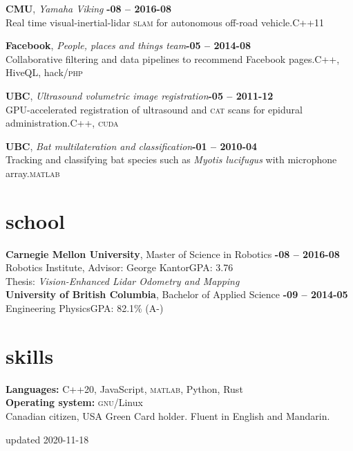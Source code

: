 \documentclass[margin,10pt]{res}
\begin{document}
\begin{resume}
    \textbf{CMU}, \textit{Yamaha Viking} \hfill \textsc{\bfseries{}-08 -- 2016-08}\\
    Real time visual-inertial-lidar \textsc{slam} for autonomous off-road vehicle.\hfill C++11

    \textbf{Facebook}, \textit{People, places and things team}\hfill \textsc{\bfseries{}-05 -- 2014-08}\\
    Collaborative filtering and data pipelines to recommend Facebook pages.\hfill C++, HiveQL, hack/\textsc{php}

    \textbf{UBC}, \textit{Ultrasound volumetric image registration}\hfill \textsc{\bfseries{}-05 -- 2011-12}\\
    GPU-accelerated registration of ultrasound and \textsc{cat} scans for epidural administration.\hfill C++, \textsc{cuda}

    \textbf{UBC}, \textit{Bat multilateration and classification}\hfill \textsc{\bfseries{}-01 -- 2010-04}\\
    Tracking and classifying bat species such as {\em Myotis lucifugus} with microphone array.\hfill \textsc{matlab}

\section{\sc \lsstyle school}
    \textbf{Carnegie Mellon University}, Master of Science in Robotics \hfill \textsc{\bfseries{}-08 -- 2016-08}\\
    Robotics Institute, Advisor: George Kantor\hfill GPA: 3.76\\
    Thesis: \textit{Vision-Enhanced Lidar Odometry and Mapping}\vspace{3pt}\\
    \textbf{University of British Columbia}, Bachelor of Applied Science \hfill \textsc{\bfseries{}-09 -- 2014-05}\\
    Engineering Physics\hfill GPA: 82.1\% (A-)%
\section{\sc \lsstyle skills}
    \textbf{Languages:}
    C++20, JavaScript, \textsc{matlab}, Python, Rust \\
    \textbf{Operating system:} \textsc{gnu}/Linux\\
    Canadian citizen, USA Green Card holder. Fluent in English and Mandarin.\\
\end{resume}
\begin{minipage}[t]{\textwidth}
    \flushright
    \small
    \sc \lsstyle
    \hfill updated 2020-11-18
\end{minipage}
\end{document}
